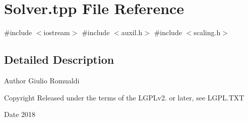 \section{Solver.\+tpp File Reference}
\label{Solver_8tpp}
{\ttfamily \#include $<$iostream$>$}\newline
{\ttfamily \#include $<$auxil.\+h$>$}\newline
{\ttfamily \#include $<$scaling.\+h$>$}\newline


\subsection{Detailed Description}
\begin{DoxyAuthor}{Author}
Giulio Romualdi 
\end{DoxyAuthor}
\begin{DoxyCopyright}{Copyright}
Released under the terms of the L\+G\+P\+Lv2. or later, see L\+G\+P\+L.\+T\+XT 
\end{DoxyCopyright}
\begin{DoxyDate}{Date}
2018 
\end{DoxyDate}
